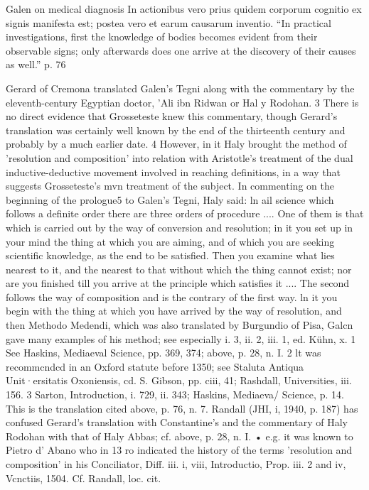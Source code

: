 Galen on medical diagnosis
In actionibus vero prius quidem corporum cognitio ex signis manifesta est; postea vero et earum causarum inventio.
“In practical investigations, first the knowledge of bodies becomes evident from their observable signs; only afterwards does one arrive at the discovery of their causes as well.”
p. 76

Gerard of Cremona translatcd Galen's Tegni along with the commentary
by the eleventh-century Egyptian doctor, 'Ali ibn Ridwan
or Hal y Rodohan. 3 There is no direct evidence that Grosseteste
knew this commentary, though Gerard's translation was certainly
well known by the end of the thirteenth century and probably by
a much earlier date. 4 However, in it Haly brought the method of
'resolution and composition' into relation with Aristotle's treatment
of the dual inductive-deductive movement involved in reaching
definitions, in a way that suggests Grosseteste's mvn treatment of
the subject. In commenting on the beginning of the prologue5 to
Galen's Tegni, Haly said:
ln ail science which follows a definite order there are three orders of
procedure .... One of them is that which is carried out by the way of conversion
and resolution; in it you set up in your mind the thing at which
you are aiming, and of which you are seeking scientific knowledge, as the
end to be satisfied. Then you examine what lies nearest to it, and the
nearest to that without which the thing cannot exist; nor are you finished
till you arrive at the principle which satisfies it .... The second follows the
way of composition and is the contrary of the first way. ln it you begin
with the thing at which you have arrived by the way of resolution, and then
Methodo Medendi, which was also translated by Burgundio of Pisa, Galcn gave many
examples of his method; see especially i. 3, ii. 2, iii. 1, ed. Kühn, x.
1 See Haskins, Mediaeval Science, pp. 369, 374; above, p. 28, n. I.
2 lt was recommcndcd in an Oxford statute before 1350; see Staluta Antiqua Unit·ersitatis
Oxoniensis, cd. S. Gibson, pp. ciii, 41; Rashdall, Universities, iii. 156.
3 Sarton, Introduction, i. 729, ii. 343; Haskins, Mediaeva/ Science, p. 14. This is the
translation cited above, p. 76, n. 7. Randall (JHI, i, 1940, p. 187) has confused Gerard's
translation with Constantine's and the commentary of Haly Rodohan with that of Haly
Abbas; cf. above, p. 28, n. I.
• e.g. it was known to Pietro d' Abano who in 13 ro indicated the history of the terms
'resolution and composition' in his Conciliator, Diff. iii. i, viii, Introductio, Prop. iii.
2 and iv, Vcnctiis, 1504. Cf. Randall, loc. cit.
